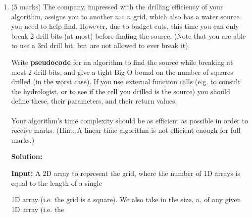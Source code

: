 \documentclass[a4,13pt]{extarticle}
\newenvironment{Solution}{\color{blue}\textbf{Solution:}}{}
\begin{document}
\begin{enumerate}
\begin{enumerate}
\begin{Solution}
If we find neither the correct row or column, we check if our drill bit has broken.

If it has, we set $x\gets\dfrac{x}2$, and $y\gets\dfrac{y}2$.

Otherwise, we set $x\gets2x$, and $y\gets2y$.

Clearly, as we halve the search area on each iteration, the number of holes needed to be drilled to find the water source is bounded by $O(\log n)$.

i.e. We are simply applying binary searches to both the $x$ and $y$ co-ordinates.
	      	\end{Solution}
	      	      	      	              
	      	\item 
	      	      (5 marks) The company, impressed with the drilling efficiency of your algorithm, assigns you to another $n \times n$ grid, 
	      	      which also has a water source you need to help find. However, due to budget cuts, this time you can only break $2$ drill 
	      	      bits (at most) before finding the source. (Note that you are able to use a $3$rd drill bit, but are not allowed to ever break it).
	      	      	      	              
	      	      Write \textbf{pseudocode} for an algorithm to find the source while breaking at most $2$ drill bits, and give a tight Big-O 
	      	      bound on the number of squares drilled (in the worst case). If you use external function calls (e.g. to consult the hydrologist, 
	      	      or to see if the cell you drilled is the source) you should define these, their parameters, and their return values. \\\\
	      	      Your algorithm's time complexity should be as efficient as possible in order to receive marks. 
	      	      (Hint: A linear time algorithm is not efficient enough for full marks.)
	      	      
	      	\begin{Solution}
\begin{algorithm}[H]

      	\begin{algorithmic}[1]
\State\textbf{Input: }A 2D array to represent the grid, where the number of 1D arrays is equal to the length of a single

\quad\quad\quad 1D array (i.e. the grid is a square). We also take in the size, $n$, of any given 1D array (i.e. the


\end{algorithmic}
\end{algorithm}
\end{Solution}
\end{enumerate}
\end{enumerate}
\end{document}
